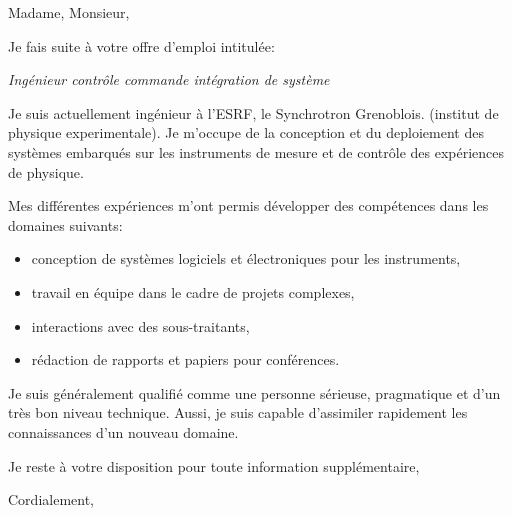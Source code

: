 \documentclass[11pt]{letter} %
\begin{document}
\signature{Le Mentec Fabien}               %
\longindentation=0pt                       %
\let\raggedleft\raggedright                %
 
\begin{letter}{}
\vfill %

\opening{Madame, Monsieur,} 

\noindent
Je fais suite \`{a} votre offre d'emploi intitul\'{e}e:
\begin{center}
  \textit{Ing\'{e}nieur contr\^{o}le commande int\'{e}gration de syst\`{e}me}
\end{center}

\noindent
Je suis actuellement ing\'{e}nieur \`{a} l'ESRF, le Synchrotron Grenoblois.
(institut de physique experimentale). Je m'occupe de la conception et du deploiement
des syst\`{e}mes embarqu\'{e}s sur les instruments de mesure et de contr\^{o}le des
exp\'{e}riences de physique.

\noindent
Mes diff\'{e}rentes exp\'{e}riences m'ont permis d\'{e}velopper des comp\'{e}tences
dans les domaines suivants:
\begin{itemize}
\item conception de syst\`{e}mes logiciels et \'{e}lectroniques pour les instruments,
\item travail en \'{e}quipe dans le cadre de projets complexes,
\item interactions avec des sous-traitants,
\item r\'{e}daction de rapports et papiers pour conf\'{e}rences.
\end{itemize}

\noindent
Je suis g\'{e}n\'{e}ralement qualifi\'{e} comme une personne s\'{e}rieuse, pragmatique
et d'un tr\`{e}s bon niveau technique. Aussi, je suis capable d'assimiler rapidement
les connaissances d'un nouveau domaine.

\noindent
Je reste \`{a} votre disposition pour toute information suppl\'{e}mentaire,

\closing{Cordialement,}

 
\end{letter}
 
\end{document}
